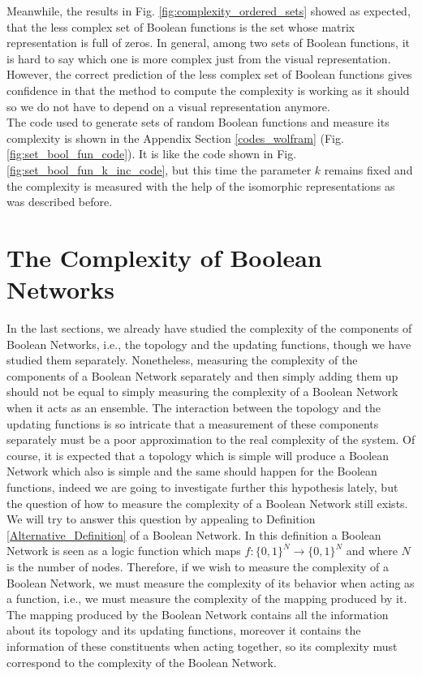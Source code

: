 Meanwhile, the results in Fig. \ref{fig:complexity_ordered_sets} showed as expected, that the less complex set of Boolean functions is the set whose matrix representation is full of zeros. In general, among two sets of Boolean functions, it is hard to say which one is more complex just from the visual representation. However, the correct prediction of the less complex set of Boolean functions gives confidence in that the method to compute the complexity is working as it should so we do not have to depend on a visual representation anymore.\\

The code used to generate sets of random Boolean functions and measure its complexity is shown in the Appendix Section \ref{codes_wolfram} (Fig. \ref{fig:set_bool_fun_code}). It is like the code shown in Fig. \ref{fig:set_bool_fun_k_inc_code}, but this time the parameter $k$ remains fixed and the complexity is measured with the help of the isomorphic representations as was described before.

\section{The Complexity of Boolean Networks}
In the last sections, we already have studied the complexity of the components of Boolean Networks, i.e., the topology and the updating functions, though we have studied them separately. Nonetheless, measuring the complexity of the components of a Boolean Network separately and then simply adding them up should not be equal to simply measuring the complexity of a Boolean Network when it acts as an ensemble. The interaction between the topology and the updating functions is so intricate that a measurement of these components separately must be a poor approximation to the real complexity of the system. Of course, it is expected that a topology which is simple will produce a Boolean Network which also is simple and the same should happen for the Boolean functions, indeed we are going to investigate further this hypothesis lately, but the question of how to measure the complexity of a Boolean Network still exists.\\

We will try to answer this question by appealing to Definition \ref{Alternative_Definition} of a Boolean Network. In this definition a Boolean Network is seen as a logic function which maps $f: \{0,1 \}^{N} \rightarrow \{0,1 \}^{N}$ and where $N$ is the number of nodes. Therefore, if we wish to measure the complexity of a Boolean Network, we must measure the complexity of its behavior when acting as a function, i.e., we must measure the complexity of the mapping produced by it. The mapping produced by the Boolean Network contains all the information about its topology and its updating functions, moreover it contains the information of these constituents when acting together, so its complexity must correspond to the complexity of the Boolean Network.\\

